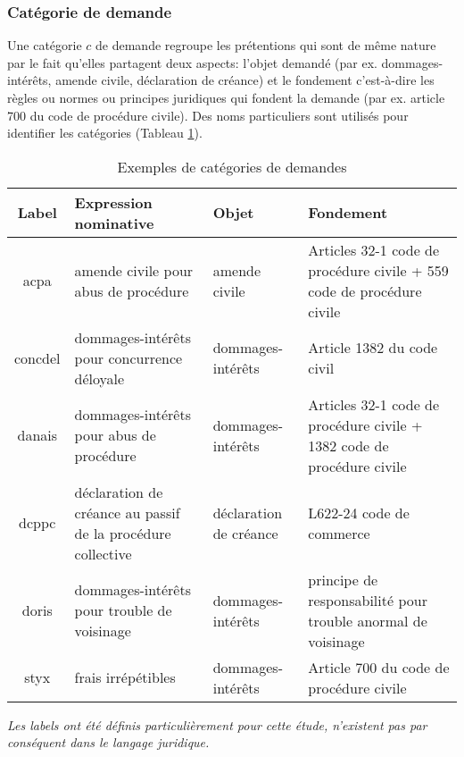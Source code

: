\subsubsection{Catégorie de demande}

Une catégorie $c$ de demande regroupe les prétentions qui sont de même nature par le fait qu'elles partagent deux aspects: l'objet demandé (par ex. dommages-intérêts, amende civile, déclaration de créance) et le fondement c'est-à-dire les règles ou normes ou principes juridiques qui fondent la demande (par ex. article 700 du code de procédure civile). Des noms particuliers sont utilisés pour identifier les catégories (Tableau \ref{tab:quanta:exemple-categorie}).

\begin{table}[!htb]
\scriptsize
\begin{tabular}{|c|p{}|p{}|p{}|}
\hline
\textbf{Label} & \textbf{Expression nominative }                                     & \textbf{Objet}                                                       & \textbf{Fondement}                                                                 \\ \hline
acpa & amende civile pour abus de procédure                         & amende civile                                               & Articles 32-1 code de procédure civile + 559 code de procédure civile  \\ \hline
concdel & dommages-intérêts pour concurrence déloyale                  & dommages-intérêts                                           & Article 1382 du code civil                                             \\ \hline
danais & dommages-intérêts pour abus de procédure                   & dommages-intérêts                                           & Articles 32-1 code de procédure civile + 1382 code de procédure civile \\ \hline
dcppc & déclaration de créance au passif de la procédure collective  & déclaration de créance & L622-24 code de commerce                                               \\ \hline
doris & dommages-intérêts pour trouble de voisinage                  & dommages-intérêts                                           & principe de responsabilité pour trouble anormal de voisinage           \\ \hline
styx & frais irrépétibles                                          & dommages-intérêts                                           & Article 700 du code de procédure civile                                 \\ \hline
\end{tabular}
\textit{Les labels ont été définis particulièrement pour cette étude, n'existent pas par conséquent dans le langage juridique.}
\caption{Exemples de catégories de demandes}\label{tab:quanta:exemple-categorie}
\end{table}

